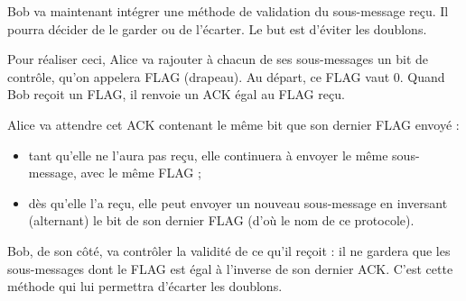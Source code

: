 \documentclass[a4paper,dvipsnames]{article}
\begin{document}
\begin{definition}[breakable, title=Description du protocole]{}{}
  Bob va maintenant intégrer une méthode de validation du sous-message reçu. Il pourra décider de le garder ou de l'écarter. Le but est d'éviter les doublons.

  \smallskip

  Pour réaliser ceci, Alice va rajouter à chacun de ses sous-messages un bit de contrôle, qu'on appelera FLAG (drapeau). Au départ, ce FLAG vaut 0. Quand Bob reçoit un FLAG, il renvoie un ACK égal au FLAG reçu.

  \smallskip

  Alice va attendre cet ACK contenant le même bit que son dernier FLAG envoyé :

  \begin{itemize}
    \item tant qu'elle ne l'aura pas reçu, elle continuera à envoyer le même sous-message, avec le même FLAG ;
    \item dès qu'elle l'a reçu, elle peut envoyer un nouveau sous-message en inversant (\og{}alternant\fg{}) le bit de son dernier FLAG (d'où le nom de ce protocole).
  \end{itemize}

  Bob, de son côté, va contrôler la validité de ce qu'il reçoit : il ne gardera que les sous-messages dont le FLAG est égal à l'inverse de son dernier ACK. C'est cette méthode qui lui permettra d'écarter les doublons.
\end{definition}

\medskip
\end{document}
